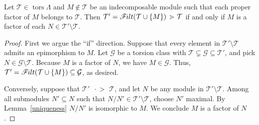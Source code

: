 \documentclass[ALCO,ThmDefs,Unicode,epreuves]{cedram}
\DeclareMathOperator{\tors}{tors}
\newcommand{\calG}{\mathcal{G}}
\newcommand{\calT}{\mathcal{T}}
\newcommand{\filt}{\mathscr{F}\Mk ilt}
\newcommand{\covers}{{\,\,\,\cdot\!\!\!\! >\,\,}}
\renewcommand{\1}{\hat{1}}
\newcommand{\0}{\hat{0}}
\newcommand*{\Mk}{\mkern -2mu}
\begin{document}
\begin{proposition}\label{prop: epis and covers}
Let $\calT\in \tors\Lambda$ and $M\not\in \calT$ be an indecomposable module such that each proper factor of $M$ belongs to $\calT$.
Then $\calT' =\filt(\calT \cup \{M\}) \covers \calT$ if and only if $M$ is a factor of each $N\in \calT'\setminus \calT$.
\end{proposition}
\begin{proof}
First we argue the ``if'' direction.
Suppose that every element in $\calT'\setminus \calT$ admits an epimorphism to $M$.
Let $\calG$ be a torsion class with $\calT \subsetneq \calG \subseteq \calT'$, and pick $N\in \calG\setminus \calT$.
Because $M$ is a factor of $N$, we have $M\in \calG$.
Thus, $\calT'=\filt(\calT \cup \{M\}) \subseteq \calG$, as desired.

Conversely, suppose that $\calT'\covers \calT$, and let $N$ be any module in $\calT'\setminus \calT$.
Among all submodules $N'\subseteq N$ such that $N/N'\in \calT'\setminus \calT$, choose $N'$ maximal.
By Lemma~\ref{uniqueness} $N/N'$ is isomorphic to $M$.
We conclude $M$ is a factor of $N$.
\end{proof}
\end{document}
